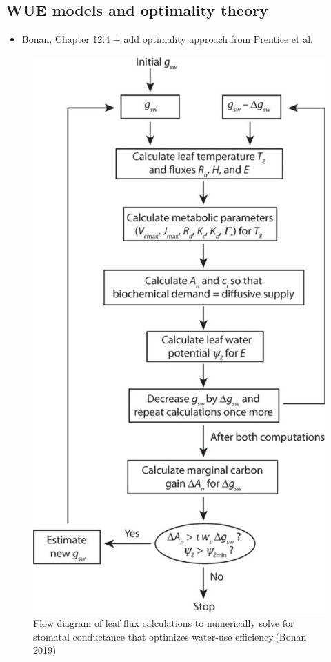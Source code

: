 \documentclass[12pt,oneside]{book}
\providecommand{\tightlist}{%
  \setlength{\itemsep}{0pt}\setlength{\parskip}{0pt}}
\begin{document}
\subsection{WUE models and optimality
theory}\label{wue-models-and-optimality-theory}

\begin{itemize}
\tightlist
\item
  Bonan, Chapter 12.4 + add optimality approach from Prentice et al.
\end{itemize}

\begin{figure}

{\centering \includegraphics[width=0.8\linewidth]{figures/chap2/optimality} 

}

\caption{Flow diagram of leaf flux calculations to numerically solve for stomatal conductance that optimizes water-use efficiency.(Bonan 2019)}\label{fig:f215}
\end{figure}
\end{document}
